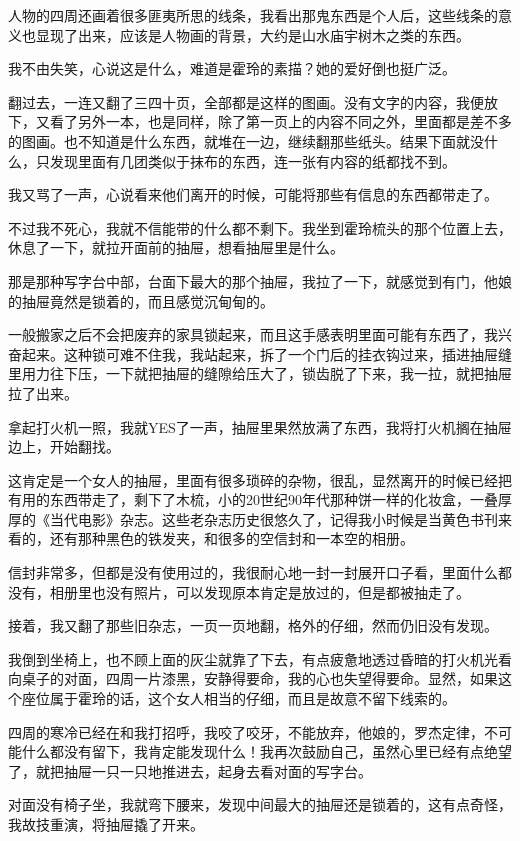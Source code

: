 人物的四周还画着很多匪夷所思的线条，我看出那鬼东西是个人后，这些线条的意义也显现了出来，应该是人物画的背景，大约是山水庙宇树木之类的东西。

我不由失笑，心说这是什么，难道是霍玲的素描？她的爱好倒也挺广泛。

翻过去，一连又翻了三四十页，全部都是这样的图画。没有文字的内容，我便放下，又看了另外一本，也是同样，除了第一页上的内容不同之外，里面都是差不多的图画。也不知道是什么东西，就堆在一边，继续翻那些纸头。结果下面就没什么，只发现里面有几团类似于抹布的东西，连一张有内容的纸都找不到。

我又骂了一声，心说看来他们离开的时候，可能将那些有信息的东西都带走了。

不过我不死心，我就不信能带的什么都不剩下。我坐到霍玲梳头的那个位置上去，休息了一下，就拉开面前的抽屉，想看抽屉里是什么。

那是那种写字台中部，台面下最大的那个抽屉，我拉了一下，就感觉到有门，他娘的抽屉竟然是锁着的，而且感觉沉甸甸的。

一般搬家之后不会把废弃的家具锁起来，而且这手感表明里面可能有东西了，我兴奋起来。这种锁可难不住我，我站起来，拆了一个门后的挂衣钩过来，插进抽屉缝里用力往下压，一下就把抽屉的缝隙给压大了，锁齿脱了下来，我一拉，就把抽屉拉了出来。

拿起打火机一照，我就YES了一声，抽屉里果然放满了东西，我将打火机搁在抽屉边上，开始翻找。

这肯定是一个女人的抽屉，里面有很多琐碎的杂物，很乱，显然离开的时候已经把有用的东西带走了，剩下了木梳，小的20世纪90年代那种饼一样的化妆盒，一叠厚厚的《当代电影》杂志。这些老杂志历史很悠久了，记得我小时候是当黄色书刊来看的，还有那种黑色的铁发夹，和很多的空信封和一本空的相册。

信封非常多，但都是没有使用过的，我很耐心地一封一封展开口子看，里面什么都没有，相册里也没有照片，可以发现原本肯定是放过的，但是都被抽走了。

接着，我又翻了那些旧杂志，一页一页地翻，格外的仔细，然而仍旧没有发现。

我倒到坐椅上，也不顾上面的灰尘就靠了下去，有点疲惫地透过昏暗的打火机光看向桌子的对面，四周一片漆黑，安静得要命，我的心也失望得要命。显然，如果这个座位属于霍玲的话，这个女人相当的仔细，而且是故意不留下线索的。

四周的寒冷已经在和我打招呼，我咬了咬牙，不能放弃，他娘的，罗杰定律，不可能什么都没有留下，我肯定能发现什么！我再次鼓励自己，虽然心里已经有点绝望了，就把抽屉一只一只地推进去，起身去看对面的写字台。

对面没有椅子坐，我就弯下腰来，发现中间最大的抽屉还是锁着的，这有点奇怪，我故技重演，将抽屉撬了开来。

